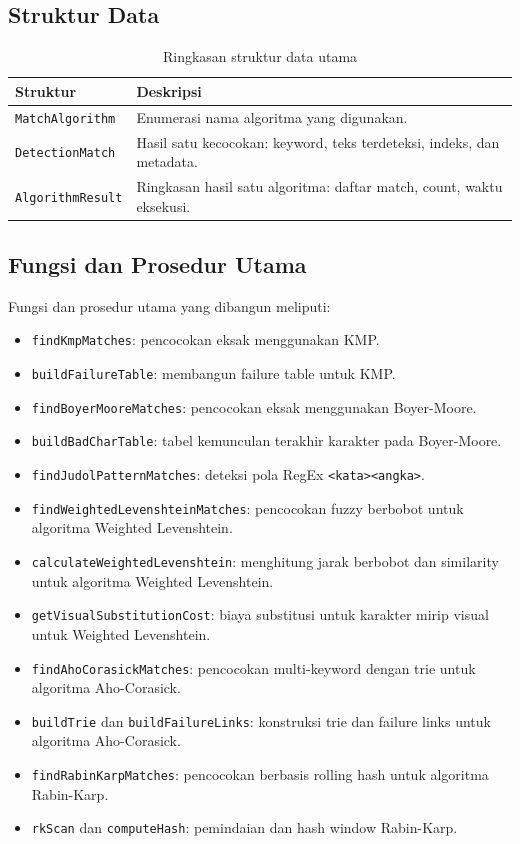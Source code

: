 \subsection{Struktur Data}

\begin{table}[H]
\centering
\caption{Ringkasan struktur data utama}
\label{tab:struktur-data}
\begin{tabular}{|p{4cm}|p{9cm}|}
\hline
\textbf{Struktur} & \textbf{Deskripsi} \\
\hline
\texttt{MatchAlgorithm} & Enumerasi nama algoritma yang digunakan. \\
\hline
\texttt{DetectionMatch} & Hasil satu kecocokan: keyword, teks terdeteksi, indeks, dan metadata. \\
\hline
\texttt{AlgorithmResult} & Ringkasan hasil satu algoritma: daftar match, count, waktu eksekusi. \\
\hline
\end{tabular}
\end{table}

\subsection{Fungsi dan Prosedur Utama}

Fungsi dan prosedur utama yang dibangun meliputi:

\begin{itemize}
	\item \texttt{findKmpMatches}: pencocokan eksak menggunakan KMP.
	\item \texttt{buildFailureTable}: membangun failure table untuk KMP.
	\item \texttt{findBoyerMooreMatches}: pencocokan eksak menggunakan Boyer-Moore.
	\item \texttt{buildBadCharTable}: tabel kemunculan terakhir karakter pada Boyer-Moore.
	\item \texttt{findJudolPatternMatches}: deteksi pola RegEx \texttt{<kata><angka>}.
	\item \texttt{findWeightedLevenshteinMatches}: pencocokan fuzzy berbobot untuk algoritma Weighted Levenshtein.
	\item \texttt{calculateWeightedLevenshtein}: menghitung jarak berbobot dan similarity untuk algoritma Weighted Levenshtein.
	\item \texttt{getVisualSubstitutionCost}: biaya substitusi untuk karakter mirip visual untuk Weighted Levenshtein.
	\item \texttt{findAhoCorasickMatches}: pencocokan multi-keyword dengan trie untuk algoritma Aho-Corasick.
	\item \texttt{buildTrie} dan \texttt{buildFailureLinks}: konstruksi trie dan failure links untuk algoritma Aho-Corasick.
	\item \texttt{findRabinKarpMatches}: pencocokan berbasis rolling hash untuk algoritma Rabin-Karp.
	\item \texttt{rkScan} dan \texttt{computeHash}: pemindaian dan hash window Rabin-Karp.
\end{itemize}

